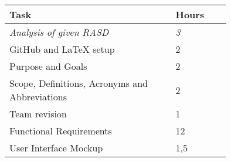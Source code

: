 \smallskip
\begin{center}
\begin{tabular}{ | p{0.75\linewidth} | l | }
  \hline
    \textbf{Task} & \textbf{Hours }\\ \hline
    \textit{Analysis of given RASD} & \textit{3} \\ \hline
    GitHub and LaTeX setup & 2 \\ \hline
    Purpose and Goals & 2 \\ \hline
    Scope, Definitions, Acronyms and Abbreviations & 2 \\ \hline
    Team revision & 1 \\ \hline
    Functional Requirements & 12 \\ \hline
    User Interface Mockup & 1,5 \\ \hline
\end{tabular}
\end{center}

\clearpage
